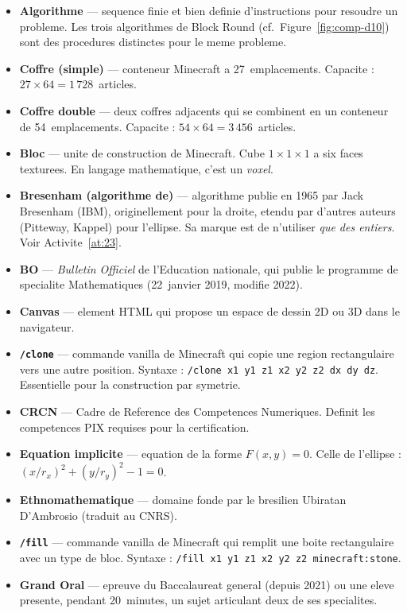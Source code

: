 \documentclass[12pt,a4paper]{scrartcl}
\newcommand{\code}[1]{\texttt{\small #1}}
\newcommand{\acc}[1]{\textcolor{accent}{\textbf{#1}}}
\newcommand{\cmd}[1]{\textcolor{earth}{\texttt{\small #1}}}
\begin{document}
\begin{itemize}[leftmargin=1.4em,itemsep=0.3em,topsep=0.3em]
  \item \acc{Algorithme} --- sequence finie et bien definie d'instructions pour resoudre un probleme. Les trois algorithmes de Block Round (cf.\ Figure~\ref{fig:comp-d10}) sont des procedures distinctes pour le meme probleme.
  \item \acc{Coffre (simple)} --- conteneur Minecraft a 27~emplacements. Capacite : $27 \times 64 = 1\,728$~articles.
  \item \acc{Coffre double} --- deux coffres adjacents qui se combinent en un conteneur de 54~emplacements. Capacite : $54 \times 64 = 3\,456$~articles.
  \item \acc{Bloc} --- unite de construction de Minecraft. Cube $1\times1\times1$ a six faces texturees. En langage mathematique, c'est un \emph{voxel}.
  \item \acc{Bresenham (algorithme de)} --- algorithme publie en 1965 par Jack Bresenham (IBM), originellement pour la droite, etendu par d'autres auteurs (Pitteway, Kappel) pour l'ellipse. Sa marque est de n'utiliser \emph{que des entiers}. Voir Activite~\ref{at:23}.
  \item \acc{BO} --- \emph{Bulletin Officiel} de l'Education nationale, qui publie le programme de specialite Mathematiques (22~janvier 2019, modifie 2022).
  \item \acc{Canvas} --- element HTML qui propose un espace de dessin 2D ou 3D dans le navigateur.
  \item \acc{\code{/clone}} --- commande vanilla de Minecraft qui copie une region rectangulaire vers une autre position. Syntaxe : \cmd{/clone x1 y1 z1 x2 y2 z2 dx dy dz}. Essentielle pour la construction par symetrie.
  \item \acc{CRCN} --- Cadre de Reference des Competences Numeriques. Definit les competences PIX requises pour la certification.
  \item \acc{Equation implicite} --- equation de la forme $F(x, y) = 0$. Celle de l'ellipse : $(x/r_x)^2 + (y/r_y)^2 - 1 = 0$.
  \item \acc{Ethnomathematique} --- domaine fonde par le bresilien Ubiratan D'Ambrosio (traduit au CNRS).
  \item \acc{\code{/fill}} --- commande vanilla de Minecraft qui remplit une boite rectangulaire avec un type de bloc. Syntaxe : \cmd{/fill x1 y1 z1 x2 y2 z2 minecraft:stone}.
  \item \acc{Grand Oral} --- epreuve du Baccalaureat general (depuis 2021) ou un\textperiodcentered e eleve presente, pendant 20~minutes, un sujet articulant deux de ses specialites.

\end{itemize}
\end{document}
